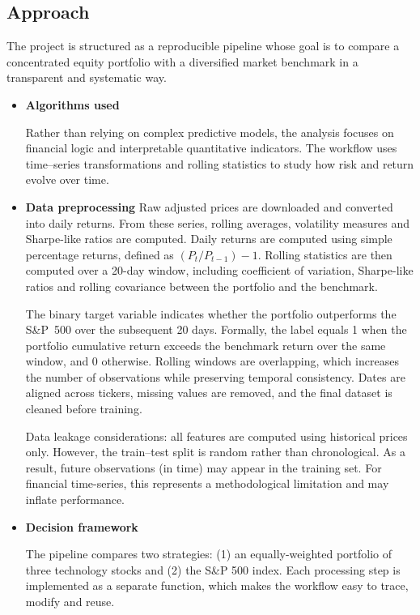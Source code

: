 \documentclass[11pt,a4paper]{article}
\begin{document}
\subsection{Approach}

\noindent The project is structured as a reproducible pipeline whose goal is to compare a concentrated equity portfolio with a diversified market benchmark in a transparent and systematic way.

\begin{itemize}

\item \textbf{Algorithms used}

Rather than relying on complex predictive models, the analysis focuses on financial logic and interpretable quantitative indicators. The workflow uses time–series transformations and rolling statistics to study how risk and return evolve over time.

\item \textbf{Data preprocessing} Raw adjusted prices are downloaded and converted into daily returns. From these series, rolling averages, volatility measures and Sharpe-like ratios are computed. Daily returns are computed using simple percentage returns, defined as $(P_t / P_{t-1}) - 1$. Rolling statistics are then computed over a 20-day window, including coefficient of variation, Sharpe-like ratios and rolling covariance between the portfolio and the benchmark. 

The binary target variable indicates whether the portfolio outperforms the S\&P~500 over the subsequent 20 days. Formally, the label equals 1 when the portfolio cumulative return exceeds the benchmark return over the same window, and 0 otherwise. Rolling windows are overlapping, which increases the number of observations while preserving temporal consistency. Dates are aligned across tickers, missing values are removed, and the final dataset is cleaned before training.

Data leakage considerations: all features are computed using historical prices only. However, the train–test split is random rather than chronological. As a result, future observations (in time) may appear in the training set. For financial time-series, this represents a methodological limitation and may inflate performance.

\item \textbf{Decision framework}

The pipeline compares two strategies: (1) an equally-weighted portfolio of three technology stocks and (2) the S\&P 500 index. Each processing step is implemented as a separate function, which makes the workflow easy to trace, modify and reuse.


\end{itemize}
\end{document}
